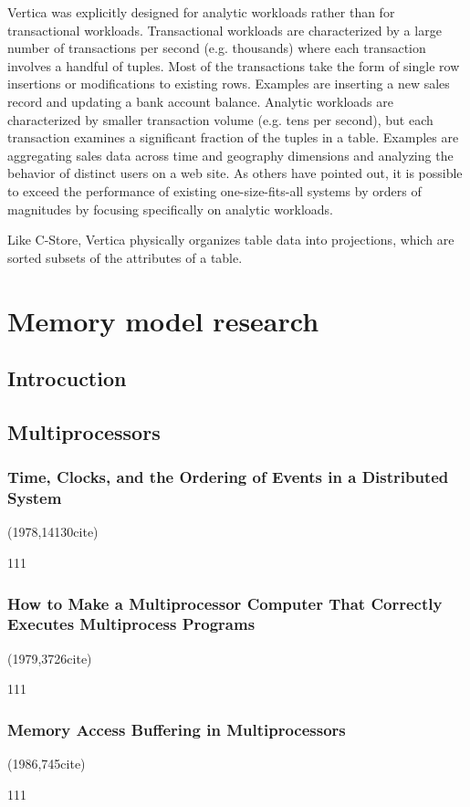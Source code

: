 \documentclass[a4paper,twoside]{scrbook}
\begin{document}
Vertica was explicitly designed for analytic workloads rather than for transactional workloads.
Transactional workloads are characterized by a large number of transactions per second (e.g. thousands) where each transaction involves a handful of tuples. Most of the transactions take the form of single row insertions or modifications to existing rows. Examples are inserting a new sales record and updating a bank account balance.
Analytic workloads are characterized by smaller transaction volume (e.g. tens per second), but each transaction examines a significant fraction of the tuples in a table. Examples are aggregating sales data across time and geography dimensions and analyzing the behavior of distinct users on a web site.
As others have pointed out, it is possible to exceed the performance of existing one-size-fits-all systems by orders of magnitudes by focusing specifically on analytic workloads.

Like C-Store, Vertica physically organizes table data into projections, which are sorted subsets of the attributes of a table. 


\chapter{Memory model research}
\section{Introcuction}
\section{Multiprocessors}
\subsection{Time, Clocks, and the Ordering of Events in a Distributed System\cite{lamport2019time}}
(1978,14130cite)\par
111
\subsection{How to Make a Multiprocessor Computer That Correctly Executes Multiprocess Programs\cite{lamport1979make}}
(1979,3726cite)\par
111
\subsection{Memory Access Buffering in Multiprocessors\cite{dubois1986memory}}
(1986,745cite)\par
111
\end{document}
